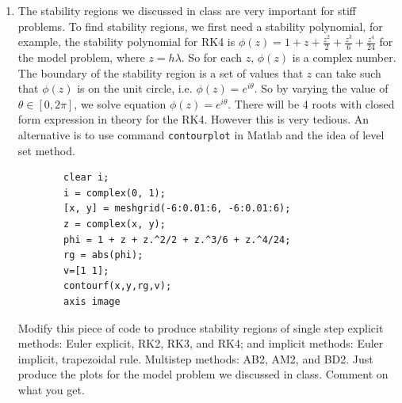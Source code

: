 \documentclass[10pt]{report}
\begin{document}
\begin{enumerate}
	\item 
	The stability regions we discussed in class are very important for stiff problems. To find stability regions, we first need a stability polynomial, for example, the stability polynomial for RK4 is $\phi(z) = 1 + z + \frac{z^2}{2} + \frac{z^3}{6} + \frac{z^4}{24}$ for the model problem, where $z=h\lambda$. So for each $z$, $\phi(z)$ is a complex number. The boundary of the stability region is a set of values that $z$ can take such that $\phi(z)$ is on the unit circle, i.e. $\phi(z) = e^{i\theta}$. So by varying the value of $\theta\in [0, 2\pi]$, we solve equation $\phi(z) = e^{i\theta}$. There will be 4 roots with closed form expression in theory for the RK4. However this is very tedious. An alternative is to use command \texttt{contourplot} in Matlab and the idea of level set method.
	\begin{verbatim}
		clear i;
		i = complex(0, 1);
		[x, y] = meshgrid(-6:0.01:6, -6:0.01:6);
		z = complex(x, y);
		phi = 1 + z + z.^2/2 + z.^3/6 + z.^4/24;
		rg = abs(phi);
		v=[1 1];
		contourf(x,y,rg,v);
		axis image
	\end{verbatim}
	Modify this piece of code to produce stability regions of single step explicit methods: Euler explicit, RK2, RK3, and RK4; and implicit methods: Euler implicit, trapezoidal rule. Multistep methods: AB2, AM2, and BD2. Just produce the plots for the model problem we discussed in class. Comment on what you get.
	

\end{enumerate}
\end{document}
